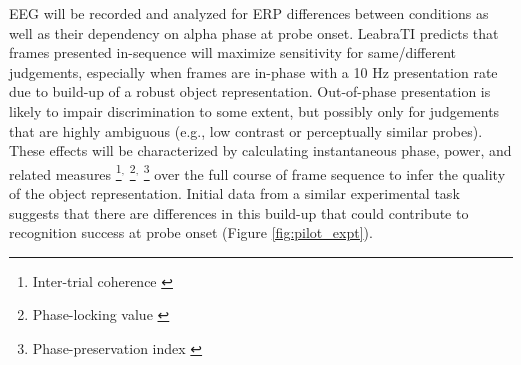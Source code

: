 \documentclass[12pt]{article}
\begin{document}
EEG will be recorded and analyzed for ERP differences between conditions as well as their dependency on alpha phase at probe onset. LeabraTI predicts that frames presented in-sequence will maximize sensitivity for same/different judgements, especially when frames are in-phase with a 10 Hz presentation rate due to build-up of a robust object representation. Out-of-phase presentation is likely to impair discrimination to some extent, but possibly only for judgements that are highly ambiguous (e.g., low contrast or perceptually similar probes). These effects will be characterized by calculating instantaneous phase, power, and related measures
\footnote{Inter-trial coherence \cite{Tallon-BaudryBertrandDelpuechEtAl96}}$^,$
\footnote{Phase-locking value \cite{LachauxRodriguezMartinerieEtAl99,SchackKlimesch02}}$^,$
\footnote{Phase-preservation index \cite{MazaheriJensen06}} 
over the full course of frame sequence to infer the quality of the object representation. Initial data from a similar experimental task \cite{DohertyRaoMesulamEtAl05} suggests that there are differences in this build-up that could contribute to recognition success at probe onset (Figure \ref{fig:pilot_expt}).
\end{document}

